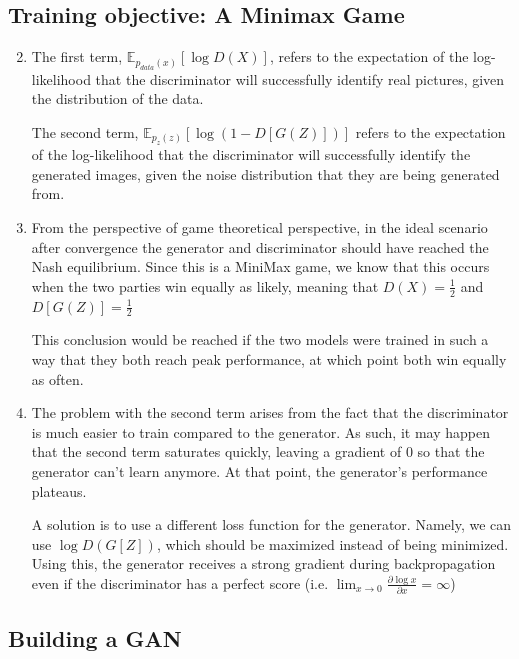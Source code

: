 \documentclass{article}
\newcommand{\del}[2]{\ensuremath{\frac{\partial #1}{\partial #2}}}
\begin{document}
\subsection{Training objective: A Minimax Game}

\begin{enumerate}[label=\textbf{2.\arabic*}]
  \setcounter{enumi}{1}
  \item
  The first term, $\mathbb{E}_{p_{data}(x)} \left[\log D(X) \right]$, refers to the expectation of the log-likelihood that the discriminator will successfully identify real pictures, given the distribution of the data.

  The second term, $\mathbb{E}_{p_{z}(z)} \left[\log (1 - D[G(Z)]) \right]$ refers to the expectation of the log-likelihood that the discriminator will successfully identify the generated images, given the noise distribution that they are being generated from.

  \item
  From the perspective of game theoretical perspective, in the ideal scenario after convergence the generator and discriminator should have reached the Nash equilibrium. Since this is a MiniMax game, we know that this occurs when the two parties win equally as likely, meaning that $D(X) = \frac{1}{2}$ and $D[G(Z)] = \frac{1}{2}$

  This conclusion would be reached if the two models were trained in such a way that they both reach peak performance, at which point both win equally as often.

  \item
  The problem with the second term arises from the fact that the discriminator is much easier to train compared to the generator. As such, it may happen that the second term saturates quickly, leaving a gradient of $0$ so that the generator can't learn anymore. At that point, the generator's performance plateaus.

  A solution is to use a different loss function for the generator. Namely, we can use $\log D(G[Z])$, which should be maximized instead of being minimized. Using this, the generator receives a strong gradient during backpropagation even if the discriminator has a perfect score (i.e. $\lim_{x\to 0} \del{\log x}{x} = \infty$)

\end{enumerate}

\subsection{Building a GAN}
\end{document}
